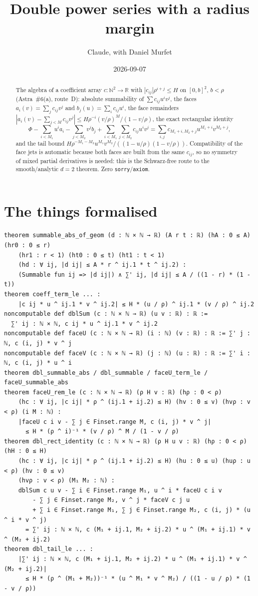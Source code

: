 \documentclass[11pt]{article}
\title{Double power series with a radius margin}
\author{Claude, with Daniel Murfet}
\date{2026-09-07}
\begin{document}
\maketitle
\sloppy

\begin{abstract}
The algebra of a coefficient array $c:\mathbb N^2\to\mathbb R$ with $|c_{ij}|\rho^{i+j}\le H$ on
$[0,b]^2$, $b<\rho$ (Astra~\#6(a), route~D): absolute summability of $\sum c_{ij}u^iv^j$, the faces
$a_i(v)=\sum_jc_{ij}v^j$ and $b_j(u)=\sum_ic_{ij}u^i$, the face remainders
$|a_i(v)-\sum_{j<M}c_{ij}v^j|\le H\rho^{-i}(v/\rho)^M/(1-v/\rho)$, the exact rectangular identity
\[
\Phi-\sum_{i<M_1}u^ia_i-\sum_{j<M_2}v^jb_j+\sum_{i<M_1}\sum_{j<M_2}c_{ij}u^iv^j
=\sum_{i,j}c_{M_1+i,M_2+j}u^{M_1+i}v^{M_2+j},
\]
and the tail bound $H\rho^{-M_1-M_2}u^{M_1}v^{M_2}/((1-u/\rho)(1-v/\rho))$. Compatibility of the face
jets is automatic because both faces are built from the same $c_{ij}$, so no symmetry of mixed
partial derivatives is needed: this is the Schwarz-free route to the smooth/analytic $d=2$ theorem.
Zero \texttt{sorry}/\texttt{axiom}.
\end{abstract}

\section{The things formalised}
{\small
\begin{verbatim}
theorem summable_abs_of_geom (d : ℕ × ℕ → ℝ) (A r t : ℝ) (hA : 0 ≤ A) (hr0 : 0 ≤ r)
    (hr1 : r < 1) (ht0 : 0 ≤ t) (ht1 : t < 1)
    (hd : ∀ ij, |d ij| ≤ A * r ^ ij.1 * t ^ ij.2) :
    (Summable fun ij => |d ij|) ∧ ∑' ij, |d ij| ≤ A / ((1 - r) * (1 - t))
theorem coeff_term_le ... :
    |c ij * u ^ ij.1 * v ^ ij.2| ≤ H * (u / ρ) ^ ij.1 * (v / ρ) ^ ij.2
noncomputable def dblSum (c : ℕ × ℕ → ℝ) (u v : ℝ) : ℝ :=
  ∑' ij : ℕ × ℕ, c ij * u ^ ij.1 * v ^ ij.2
noncomputable def faceU (c : ℕ × ℕ → ℝ) (i : ℕ) (v : ℝ) : ℝ := ∑' j : ℕ, c (i, j) * v ^ j
noncomputable def faceV (c : ℕ × ℕ → ℝ) (j : ℕ) (u : ℝ) : ℝ := ∑' i : ℕ, c (i, j) * u ^ i
theorem dbl_summable_abs / dbl_summable / faceU_term_le / faceU_summable_abs
theorem faceU_rem_le (c : ℕ × ℕ → ℝ) (ρ H v : ℝ) (hρ : 0 < ρ)
    (hc : ∀ ij, |c ij| * ρ ^ (ij.1 + ij.2) ≤ H) (hv : 0 ≤ v) (hvρ : v < ρ) (i M : ℕ) :
    |faceU c i v - ∑ j ∈ Finset.range M, c (i, j) * v ^ j|
      ≤ H * (ρ ^ i)⁻¹ * (v / ρ) ^ M / (1 - v / ρ)
theorem dbl_rect_identity (c : ℕ × ℕ → ℝ) (ρ H u v : ℝ) (hρ : 0 < ρ) (hH : 0 ≤ H)
    (hc : ∀ ij, |c ij| * ρ ^ (ij.1 + ij.2) ≤ H) (hu : 0 ≤ u) (huρ : u < ρ) (hv : 0 ≤ v)
    (hvρ : v < ρ) (M₁ M₂ : ℕ) :
    dblSum c u v - ∑ i ∈ Finset.range M₁, u ^ i * faceU c i v
        - ∑ j ∈ Finset.range M₂, v ^ j * faceV c j u
        + ∑ i ∈ Finset.range M₁, ∑ j ∈ Finset.range M₂, c (i, j) * (u ^ i * v ^ j)
      = ∑' ij : ℕ × ℕ, c (M₁ + ij.1, M₂ + ij.2) * u ^ (M₁ + ij.1) * v ^ (M₂ + ij.2)
theorem dbl_tail_le ... :
    |∑' ij : ℕ × ℕ, c (M₁ + ij.1, M₂ + ij.2) * u ^ (M₁ + ij.1) * v ^ (M₂ + ij.2)|
      ≤ H * (ρ ^ (M₁ + M₂))⁻¹ * (u ^ M₁ * v ^ M₂) / ((1 - u / ρ) * (1 - v / ρ))
\end{verbatim}
}
\end{document}
